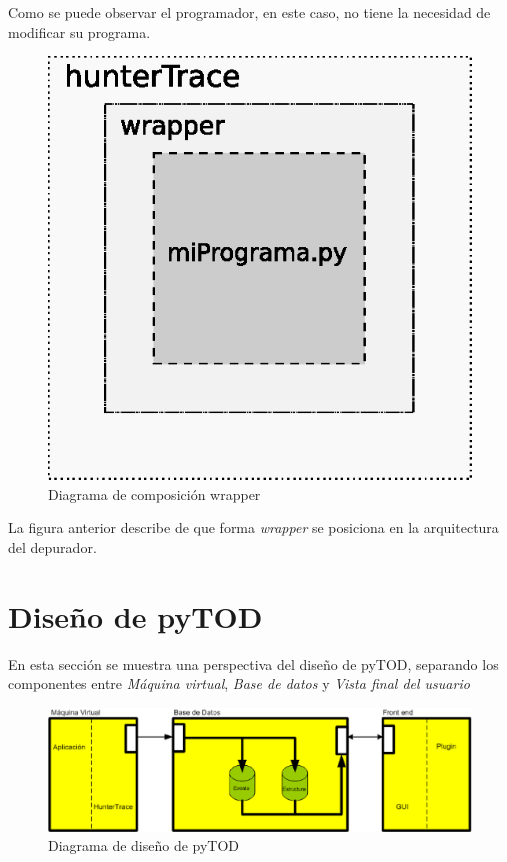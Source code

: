 \documentclass[12pt,legalpaper]{report}
\begin{document}
Como se puede observar el programador, en este caso, no tiene la necesidad de modificar su programa.

\begin{figure}[h]
	\centering
	\includegraphics[scale=1]{images/wrapper.eps}
	\caption{Diagrama de composición wrapper}
\end{figure}

La figura anterior describe de que forma \textit{wrapper} se posiciona en la arquitectura del depurador.
		
	
	\section{Diseño de pyTOD}
	
En esta sección se muestra una perspectiva del diseño de pyTOD, separando los componentes entre \textit{Máquina virtual}, \textit{Base de datos} y \textit{Vista final del usuario}

\begin{figure}[hpb]
	\centering
	\includegraphics[scale=0.4]{images/disenopyTOD.eps}
	\caption{Diagrama de diseño de pyTOD}
\end{figure}
\end{document}

